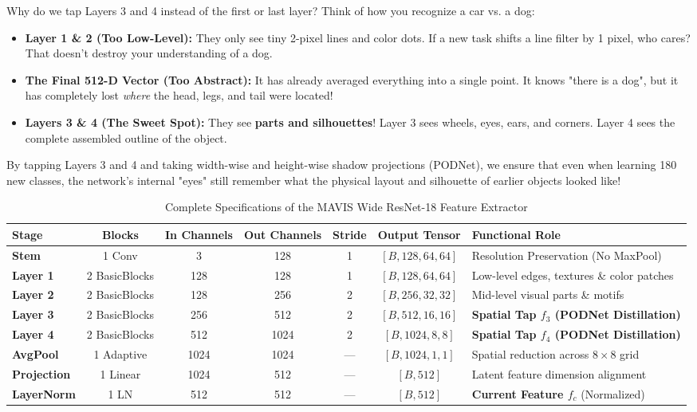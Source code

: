 \documentclass[11pt,a4paper]{article}
\begin{document}
\begin{callout}
Why do we tap Layers 3 and 4 instead of the first or last layer?\newline
Think of how you recognize a car vs. a dog:
\begin{itemize}[noitemsep]
    \item \textbf{Layer 1 \& 2 (Too Low-Level):} They only see tiny 2-pixel lines and color dots. If a new task shifts a line filter by 1 pixel, who cares? That doesn't destroy your understanding of a dog.
    \item \textbf{The Final 512-D Vector (Too Abstract):} It has already averaged everything into a single point. It knows "there is a dog", but it has completely lost \textit{where} the head, legs, and tail were located!
    \item \textbf{Layers 3 \& 4 (The Sweet Spot):} They see \textbf{parts and silhouettes}! Layer 3 sees wheels, eyes, ears, and corners. Layer 4 sees the complete assembled outline of the object.
\end{itemize}
By tapping Layers 3 and 4 and taking width-wise and height-wise shadow projections (PODNet), we ensure that even when learning 180 new classes, the network's internal "eyes" still remember what the physical layout and silhouette of earlier objects looked like!
\end{callout}

\begin{table}[h!]
\centering
\small
\renewcommand{\arraystretch}{1.2}
\caption{Complete Specifications of the MAVIS Wide ResNet-18 Feature Extractor}
\label{tab:backbone-specs}
\begin{tabularx}{\textwidth}{lcccccX}
\toprule
\textbf{Stage} & \textbf{Blocks} & \textbf{In Channels} & \textbf{Out Channels} & \textbf{Stride} & \textbf{Output Tensor} & \textbf{Functional Role} \\
\midrule
\textbf{Stem} & 1 Conv & 3 & 128 & 1 & $[B, 128, 64, 64]$ & Resolution Preservation (No MaxPool) \\
\textbf{Layer 1} & 2 BasicBlocks & 128 & 128 & 1 & $[B, 128, 64, 64]$ & Low-level edges, textures \& color patches \\
\textbf{Layer 2} & 2 BasicBlocks & 128 & 256 & 2 & $[B, 256, 32, 32]$ & Mid-level visual parts \& motifs \\
\textbf{Layer 3} & 2 BasicBlocks & 256 & 512 & 2 & $[B, 512, 16, 16]$ & \textbf{Spatial Tap $f_3$ (PODNet Distillation)} \\
\textbf{Layer 4} & 2 BasicBlocks & 512 & 1024 & 2 & $[B, 1024, 8, 8]$ & \textbf{Spatial Tap $f_4$ (PODNet Distillation)} \\
\textbf{AvgPool} & 1 Adaptive & 1024 & 1024 & — & $[B, 1024, 1, 1]$ & Spatial reduction across $8 \times 8$ grid \\
\textbf{Projection} & 1 Linear & 1024 & 512 & — & $[B, 512]$ & Latent feature dimension alignment \\
\textbf{LayerNorm} & 1 LN & 512 & 512 & — & $[B, 512]$ & \textbf{Current Feature $f_c$} (Normalized) \\
\bottomrule
\end{tabularx}
\end{table}
\end{document}
